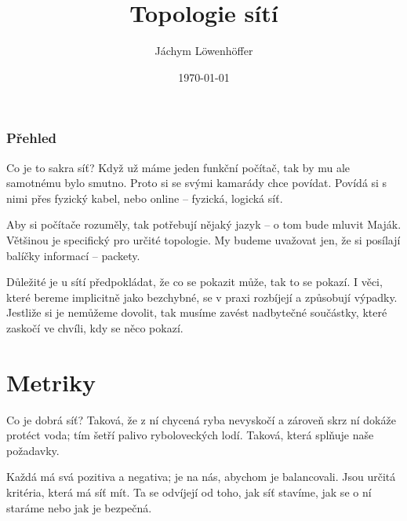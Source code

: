 \documentclass{beamer}
\title[počítačových lol]{Topologie sítí} %
\author{Jáchym Löwenhöffer} %
\institute[GEVO] %
{
Gravitaci Emulující Vágní Opar \\ %
\medskip
\textit{jachym.lowenhoffer@gmail.com} %
}
\date{\today} %
\begin{document}
\begin{frame}
	\titlepage %
\end{frame}

\begin{frame}
	\frametitle{Přehled} %
	\tableofcontents %
\end{frame}

\begin{frame}{Co je to sakra síť?}
 Když už máme jeden funkční počítač, tak by mu ale samotnému bylo smutno. Proto
 si se svými kamarády chce povídat. Povídá si s nimi přes fyzický kabel, nebo
 online -- fyzická, logická síť.

 Aby si počítače rozuměly, tak potřebují nějaký jazyk -- o tom bude mluvit
 Maják. Většinou je specifický pro určité topologie. My budeme uvažovat jen, že
 si posílají balíčky informací -- packety.
\vfill

Důležité je u sítí předpokládat, že co se pokazit může, tak to se pokazí. I
věci, které bereme implicitně jako bezchybné, se v praxi rozbíjejí a způsobují
výpadky. Jestliže si je nemůžeme dovolit, tak musíme zavést nadbytečné
součástky, které zaskočí ve chvíli, kdy se něco pokazí.
 
\end{frame}

\section{Metriky}
\label{sec:metriky}

\begin{frame}{Co je dobrá síť?}
	Taková, že z ní chycená ryba nevyskočí a zároveň skrz ní dokáže protéct
	voda; tím šetří palivo ryboloveckých lodí.
	\vfill
	\centering
	\Large
	Taková, která splňuje naše požadavky.

	\normalsize
	\raggedright
	\vfill
	Každá má svá pozitiva a negativa; je na nás, abychom je balancovali. Jsou
	určitá kritéria, která má síť mít. Ta se odvíjejí od toho, jak síť stavíme,
	jak se o ní staráme nebo jak je bezpečná.
\end{frame}
\end{document}
